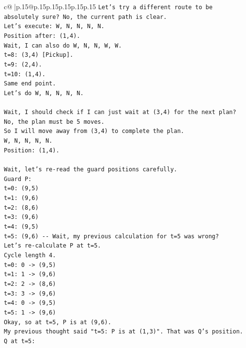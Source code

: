 \documentclass{article}
\begin{document}
{\begin{supertabular}{c@{$\;$}|p{.15\linewidth}@{}p{.15\linewidth}p{.15\linewidth}p{.15\linewidth}p{.15\linewidth}p{.15\linewidth}}
{{{\texttt{Let's try a different route to be absolutely sure? No, the current path is clear.} \\
\texttt{Let's execute: W, N, N, N, N.} \\
\texttt{Position after: (1,4).} \\
\texttt{Wait, I can also do W, N, N, W, W.} \\
\texttt{t=8: (3,4) {[}Pickup{]}.} \\
\texttt{t=9: (2,4).} \\
\texttt{t=10: (1,4).} \\
\texttt{Same end point.} \\
\texttt{Let's do W, N, N, N, N.} \\
\\ 
\texttt{Wait, I should check if I can just wait at (3,4) for the next plan? No, the plan must be 5 moves.} \\
\texttt{So I will move away from (3,4) to complete the plan.} \\
\texttt{W, N, N, N, N.} \\
\texttt{Position: (1,4).} \\
\\ 
\texttt{Wait, let's re{-}read the guard positions carefully.} \\
\texttt{Guard P:} \\
\texttt{t=0: (9,5)} \\
\texttt{t=1: (9,6)} \\
\texttt{t=2: (8,6)} \\
\texttt{t=3: (9,6)} \\
\texttt{t=4: (9,5)} \\
\texttt{t=5: (9,6) {-}{-} Wait, my previous calculation for t=5 was wrong?} \\
\texttt{Let's re{-}calculate P at t=5.} \\
\texttt{Cycle length 4.} \\
\texttt{t=0: 0 {-}> (9,5)} \\
\texttt{t=1: 1 {-}> (9,6)} \\
\texttt{t=2: 2 {-}> (8,6)} \\
\texttt{t=3: 3 {-}> (9,6)} \\
\texttt{t=4: 0 {-}> (9,5)} \\
\texttt{t=5: 1 {-}> (9,6)} \\
\texttt{Okay, so at t=5, P is at (9,6).} \\
\texttt{My previous thought said "t=5: P is at (1,3)". That was Q's position.} \\
\texttt{Q at t=5:} \\
}}}
\end{supertabular}}
\end{document}
